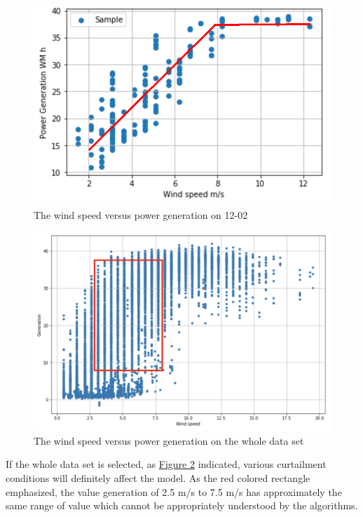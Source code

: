 \documentclass[12pt,a4paper]{report}
\begin{document}
                    \begin{figure}[ht]
                        \centerline{\includegraphics[scale=1.4]{powervsgenerationsample}}
                        \caption{The wind speed versus power generation on 12-02}
                        \label{plot_speed_vs_power_1202}
                    \end{figure}

                    \begin{figure}[ht]
                        \centerline{\includegraphics[scale=0.2]{generationvsspeedwholeset}}
                        \caption{The wind speed versus power generation on the whole data set}
                        \label{plot_speed_vs_power_whole}
                    \end{figure}
                
                    If the whole data set is selected, as \hyperref[plot_speed_vs_power_whole]{Figure \ref*{plot_speed_vs_power_whole}} indicated, various curtailment conditions will definitely affect the model. As the red colored rectangle emphasized, the value generation of 2.5 m/s to 7.5 m/s has approximately the same range of value which cannot be appropriately understood by the algorithms.
\end{document}
